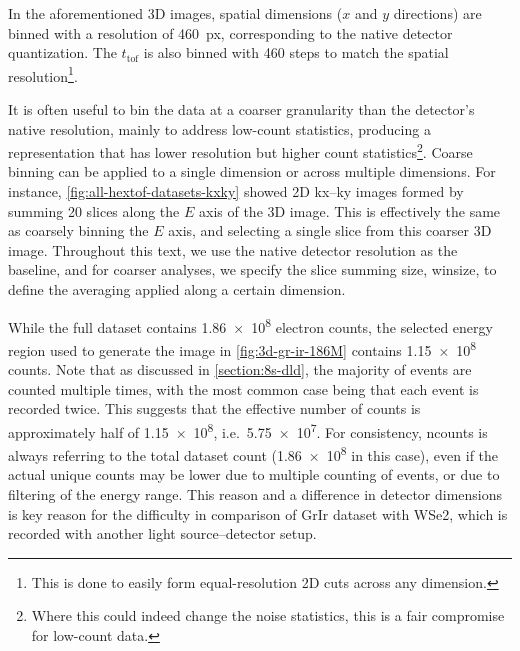 In the aforementioned 3D images, spatial dimensions ($x$ and $y$ directions) are binned with a resolution of \qty{460}{px}, corresponding to the native detector quantization. The $t_{\text{tof}}$ is also binned with \num{460} steps to match the spatial resolution\footnote{This is done to easily form equal-resolution 2D cuts across any dimension.}. 

It is often useful to bin the data at a coarser granularity than the detector's native resolution, mainly to address low-count statistics, producing a representation that has lower resolution but higher count statistics\footnote{Where this could indeed change the noise statistics, this is a fair compromise for low-count data.}. Coarse binning can be applied to a single dimension or across multiple dimensions. For instance, \cref{fig:all-hextof-datasets-kxky} showed 2D \gls{kx}--\gls{ky} images formed by summing \num{20} slices along the $E$ axis of the 3D image. This is effectively the same as coarsely binning the $E$ axis, and selecting a single slice from this coarser 3D image. Throughout this text, we use the native detector resolution as the baseline, and for coarser analyses, we specify the slice summing size, \gls{winsize}, to define the averaging applied along a certain dimension. 

While the full dataset contains \num{1.86e8} electron counts, the selected energy region used to generate the image in \cref{fig:3d-gr-ir-186M} contains \num{1.15e8} counts. Note that as discussed in \cref{section:8s-dld}, the majority of events are counted multiple times, with the most common case being that each event is recorded twice. This suggests that the effective number of counts is approximately half of \num{1.15e8}, i.e.\ \num{5.75e7}. For consistency, \gls{ncounts} is always referring to the total dataset count (\num{1.86e8} in this case), even if the actual unique counts may be lower due to multiple counting of events, or due to filtering of the energy range. This reason and a difference in detector dimensions is key reason for the difficulty in comparison of \gls{GrIr} dataset with \gls{WSe2}, which is recorded with another light source--detector setup.

